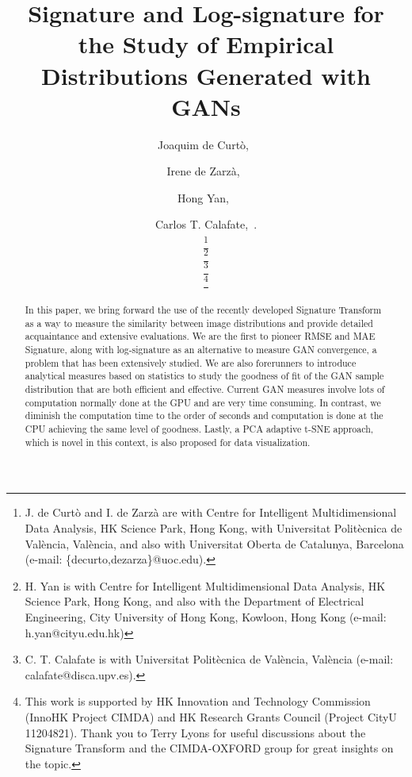 \documentclass[lettersize,journal]{IEEEtran}
\begin{document}
\lstset{language=Python}

\title{Signature and Log-signature for the Study of Empirical Distributions Generated with GANs}

\author{Joaquim {de Curt\`o}\textsuperscript{\textsection},~ \and Irene {de Zarz\`a}\textsuperscript{\textsection},~\\ \and Hong Yan,~ \and Carlos T. Calafate,~.


\thanks{J. de Curt\`o and I. de Zarz\`a are with Centre for Intelligent Multidimensional Data Analysis, HK Science Park, Hong Kong, with Universitat Polit\`ecnica de Val\`encia, Val\`encia, and also with Universitat Oberta de Catalunya, Barcelona (e-mail: \{decurto,dezarza\}@uoc.edu).}

\thanks{H. Yan is with Centre for Intelligent Multidimensional Data Analysis, HK Science Park, Hong Kong, and also with the Department of Electrical Engineering, City University of Hong Kong, Kowloon, Hong Kong (e-mail: h.yan@cityu.edu.hk)}

\thanks{C. T. Calafate is with Universitat Polit\`ecnica de Val\`encia, Val\`encia (e-mail: calafate@disca.upv.es).}

\thanks{This work is supported by HK Innovation and Technology Commission (InnoHK Project CIMDA) and HK Research Grants Council (Project CityU 11204821). Thank you to Terry Lyons for useful discussions about the Signature Transform and the CIMDA-OXFORD group for great insights on the topic.}

}


\maketitle
\begingroup\renewcommand\thefootnote{\textsection}
\endgroup

\begin{abstract}
In this paper, we bring forward the use of the recently developed Signature Transform as a way to measure the similarity between image distributions and provide detailed acquaintance and extensive evaluations. We are the first to pioneer RMSE and MAE Signature, along with log-signature as an alternative to measure GAN convergence, a problem that has been extensively studied. We are also forerunners to introduce analytical measures based on statistics to study the goodness of fit of the GAN sample distribution that are both efficient and effective. Current GAN measures involve lots of computation normally done at the GPU and are very time consuming. In contrast, we diminish the computation time to the order of seconds and computation is done at the CPU achieving the same level of goodness. Lastly, a PCA adaptive t-SNE approach, which is novel in this context, is also proposed for data visualization.
\end{abstract}
\end{document}
